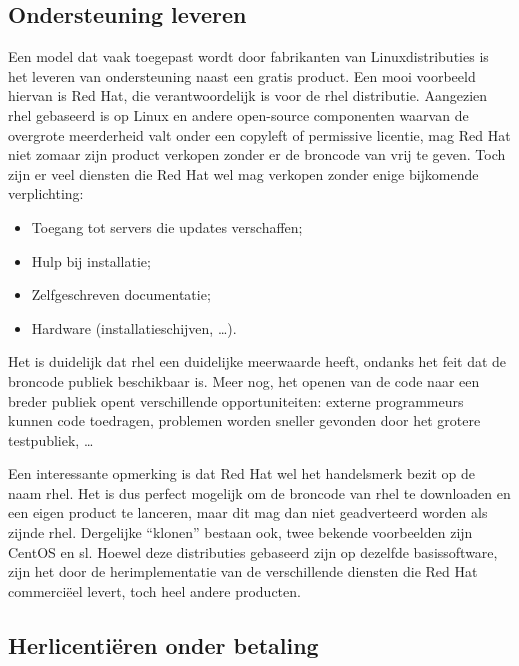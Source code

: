 \subsection{Ondersteuning leveren}
\label{ontwerp:licenties:commercialiseren:ondersteuning}

Een model dat vaak toegepast wordt door fabrikanten van Linuxdistributies is het leveren van ondersteuning naast een gratis product. Een mooi voorbeeld hiervan is Red Hat, die verantwoordelijk is voor de \ac{rhel} distributie. Aangezien \ac{rhel} gebaseerd is op Linux en andere open-source componenten waarvan de overgrote meerderheid valt onder een copyleft of permissive licentie, mag Red Hat niet zomaar zijn product verkopen zonder er de broncode van vrij te geven. Toch zijn er veel diensten die Red Hat wel mag verkopen zonder enige bijkomende verplichting:
\begin{itemize}
  \item Toegang tot servers die updates verschaffen;
  \item Hulp bij installatie;
  \item Zelfgeschreven documentatie;
  \item Hardware (installatieschijven, \ldots).
\end{itemize}

Het is duidelijk dat \ac{rhel} een duidelijke meerwaarde heeft, ondanks het feit dat de broncode publiek beschikbaar is. Meer nog, het openen van de code naar een breder publiek opent verschillende opportuniteiten: externe programmeurs kunnen code toedragen, problemen worden sneller gevonden door het grotere testpubliek, \ldots

Een interessante opmerking is dat Red Hat wel het handelsmerk bezit op de naam \acl{rhel}. Het is dus perfect mogelijk om de broncode van \ac{rhel} te downloaden en een eigen product te lanceren, maar dit mag dan niet geadverteerd worden als zijnde \ac{rhel}. Dergelijke ``klonen'' bestaan ook, twee bekende voorbeelden zijn CentOS en \ac{sl}. Hoewel deze distributies gebaseerd zijn op dezelfde basissoftware, zijn het door de herimplementatie van de verschillende diensten die Red Hat commerciëel levert, toch heel andere producten.

\subsection{Herlicentiëren onder betaling}
\label{ontwerp:licenties:commercialiseren:herlicentieren}

